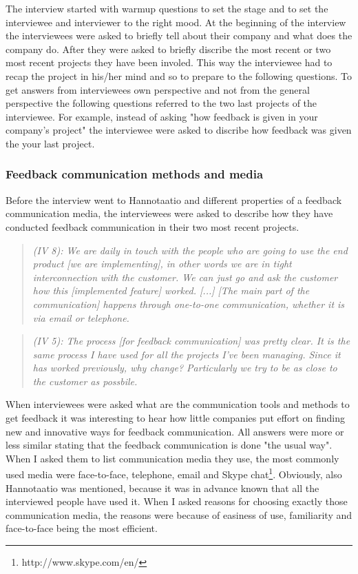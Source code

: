 \documentclass[english,12pt,a4paper,pdftex]{article}
\newcommand{\q}[2]{
\begin{quote}
\emph{(IV #1): #2}
\end{quote}}
\begin{document}
The interview started with warmup questions to set the stage and to set the interviewee and interviewer to the right mood. At the beginning of the interview the interviewees were asked to briefly tell about their company and what does the company do. After they were asked to briefly discribe the most recent or two most recent projects they have been involed. This way the interviewee had to recap the project in his/her mind and so to prepare to the following questions. To get answers from interviewees own perspective and not from the general perspective the following questions referred to the two last projects of the interviewee. For example, instead of asking "how feedback is given in your company's project" the interviewee were asked to discribe how feedback was given the your last project.

\subsubsection{Feedback communication methods and media}

Before the interview went to Hannotaatio and different properties of a feedback communication media, the interviewees were asked to describe how they have conducted feedback communication in their two most recent projects.

\q{8}{We are daily in touch with the people who are going to use the end product [we are implementing], in other words we are in tight interconnection with the customer. We can just go and ask the customer how this [implemented feature] worked. [...] [The main part of the communication] happens through one-to-one communication, whether it is via email or telephone.}

\q{5}{The process [for feedback communication] was pretty clear. It is the same process I have used for all the projects I've been managing. Since it has worked previously, why change? Particularly we try to be as close to the customer as possbile.}

When interviewees were asked what are the communication tools and methods to get feedback it was interesting to hear how little companies put effort on finding new and innovative ways for feedback communication. All answers were more or less similar stating that the feedback communication is done "the usual way". When I asked them to list communication media they use, the most commonly used media were face-to-face, telephone, email and Skype chat\footnote{http://www.skype.com/en/}. Obviously, also Hannotaatio was mentioned, because it was in advance known that all the interviewed people have used it. When I asked reasons for choosing exactly those communication media, the reasons were because of easiness of use, familiarity and face-to-face being the most efficient. 
\end{document}
